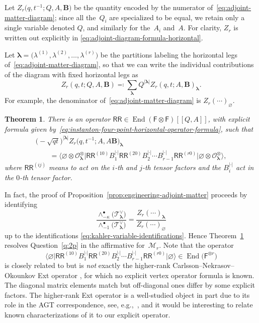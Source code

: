 \documentclass[10pt,a4paper]{amsart}
\numberwithin{equation}{section}
\newtheorem{Theorem}{Theorem}[section]
\renewcommand{\vec}[1]{\bm{#1}}
\newcommand{\cM}{\mathcal{M}}
\newcommand{\cO}{\mathcal{O}}
\newcommand{\cT}{\mathcal{T}}
\newcommand{\sF}{\mathsf{F}}
\newcommand{\sRR}{\mathsf{RR}}
\DeclareMathOperator{\End}{End}
\begin{document}
\begin{MyParagraph}
Let $Z_r\big(q,t^{-1}; Q, A, \vec B\big)$ be the quantity encoded by the
numerator of~\eqref{eq:adjoint-matter-diagram}; since all the~$Q_i$
are specialized to be equal, we retain only a single variable denoted
$Q$, and similarly for the~$A_i$ and~$A$. For clarity, $Z_r$ is
written out explicitly in
\eqref{eq:adjoint-diagram-formula-horizontal}.

Let
$\vec\lambda = \big(\lambda^{(1)}, \lambda^{(2)}, \ldots, \lambda^{(r)}\big)$
be the partitions labeling the horizontal legs of~\eqref{eq:adjoint-matter-diagram}, so that we can write the individual
contributions of the diagram with fixed horizontal legs as
\[ Z_r(q,t;Q,A,\vec B) \eqqcolon \sum_{\vec\lambda} Q^{|\vec\lambda|} Z_r(q,t; A,\vec B)_{\vec\lambda}. \]
For example, the denominator of~\eqref{eq:adjoint-matter-diagram} is
$Z_r(\cdots)_{\vec\varnothing}$.

\begin{Theorem} \label{thm:instanton-RR-operator}
 There is an operator $\sRR \in \End(\sF \otimes \sF)[[Q, A]]$, with
 explicit formula given by~\eqref{eq:instanton-four-point-horizontal-operator-formula}, such that
 \begin{gather}
 \big({-}\sqrt{qt}\big)^{|\vec\lambda|} Z_r\big(q, t^{-1}; A, A\vec B\big)_{\vec\lambda} \nonumber\\
 \qquad{}= \big\langle \varnothing \otimes \cO^{\otimes}_{\vec\lambda} \big| \sRR^{(10)} B_1^{|\cdot|} \sRR^{(20)} B_2^{|\cdot|} \cdots B_{r-1}^{|\cdot|} \sRR^{(r0)} \big| \varnothing \otimes \cO^{\otimes}_{\vec\lambda}\big\rangle,\label{eq:instanton-RR-operator-matrix-elements}
 \end{gather}
 where $\sRR^{(ij)}$ means to act on the $i$-th and $j$-th tensor
 factors and the $B_i^{|\cdot|}$ act in the $0$-th tensor factor.
\end{Theorem}
\end{MyParagraph}

\begin{MyParagraph}
In fact, the proof of
Proposition~\ref{prop:engineering-adjoint-matter} proceeds by identifying
\[ \frac{\wedge^\bullet_{-\kappa} \big(\cT_{\vec\lambda}^\vee\big)}{\wedge^\bullet_{-1} \big(\cT_{\vec\lambda}^\vee\big)} = \frac{Z_r(\cdots)_{\vec\lambda}}{Z_r(\cdots)_{\vec\varnothing}} \]
up to the identifications \eqref{eq:kahler-variable-identifications}.
Hence Theorem~\ref{thm:instanton-RR-operator} resolves
Question~\ref{q:2p} in the affirmative for~$\cM_r$. Note that the
operator
\[ \big\langle \varnothing \big| \sRR^{(10)} B_1^{|\cdot|} \sRR^{(20)} B_2^{|\cdot|} \cdots B_{r-1}^{|\cdot|} \sRR^{(r0)} \big| \varnothing\big\rangle \in \End\big(\sF^{\otimes r}\big) \]
is closely related to but is {\it not} exactly the higher-rank
Carlsson--Nekrasov--Okounkov Ext operator \cite{Carlsson2014}, for
which no explicit vertex operator formula is known. The diagonal
matrix elements match but off-diagonal ones differ by some explicit
factors. The higher-rank Ext operator is a well-studied object in part
due to its role in the AGT correspondence, see, e.g.,~\cite{Negut2018},
and it would be interesting to relate known characterizations of it to
our explicit operator.
\end{MyParagraph}
\end{document}

